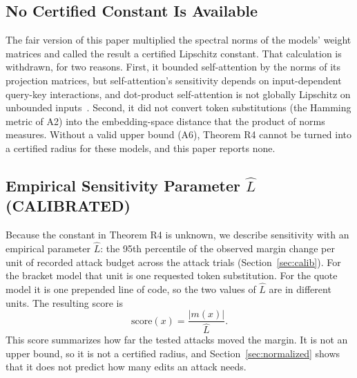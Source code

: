 \documentclass[11pt]{article}
\newcommand{\lab}[1]{{\footnotesize\MakeUppercase{#1}}}
\newcommand{\calibrated}{\lab{calibrated}}
\newcommand{\Lhat}{\hat{L}}
\begin{document}
\subsection{No Certified Constant Is Available}\label{sec:nocert}
The fair version of this paper multiplied the spectral norms of the models' weight matrices and called the result a certified Lipschitz constant. That calculation is withdrawn, for two reasons. First, it bounded self-attention by the norms of its projection matrices, but self-attention's sensitivity depends on input-dependent query-key interactions, and dot-product self-attention is not globally Lipschitz on unbounded inputs~\cite{kim2021}. Second, it did not convert token substitutions (the Hamming metric of A2) into the embedding-space distance that the product of norms measures. Without a valid upper bound (A6), Theorem R4 cannot be turned into a certified radius for these models, and this paper reports none.

\subsection{Empirical Sensitivity Parameter \texorpdfstring{$\hat{L}$}{L-hat} (\calibrated)}
Because the constant in Theorem R4 is unknown, we describe sensitivity with an empirical parameter $\Lhat$: the 95th percentile of the observed margin change per unit of recorded attack budget across the attack trials (Section~\ref{sec:calib}). For the bracket model that unit is one requested token substitution. For the quote model it is one prepended line of code, so the two values of $\Lhat$ are in different units. The resulting score is
\[
\mathrm{score}(x) = \frac{|m(x)|}{\Lhat}.
\]
This score summarizes how far the tested attacks moved the margin. It is not an upper bound, so it is not a certified radius, and Section~\ref{sec:normalized} shows that it does not predict how many edits an attack needs.
\end{document}
